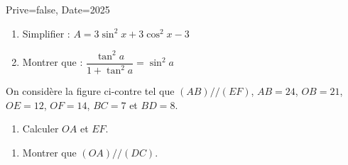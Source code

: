 \documentclass[a4paper,12pt]{article}
\begin{document}
\begin{Maquette}[Exam]{Prive=false, Date=2025}
\begin{exercice}[BaremeDetaille]
\begin{enumerate}
\begin{minipage}{0.48\linewidth}
\anserline[6]
\end{minipage}\hfill\vrule\hfill%
\begin{minipage}{0.48\linewidth}
\anserline[6]
\end{minipage}
\item{} Simplifier  :
$A = 3\sin^{2}x+3\cos^{2}x-3$\newline\anserline[7]
\item{} Montrer que : $ \dfrac{\tan^{2}a}{1+\tan^{2}a}=\sin^{2}a$

\anserline[7]
\end{enumerate}
\end{exercice}

\begin{exercice}[BaremeDetaille]
On considère la figure ci-contre tel que $(AB)//(EF)$, $AB=24$, $OB=21$, $OE=12$, $OF=14$, $BC=7$ et $BD=8$.
\vspace*{2mm}

\begin{minipage}{.7\linewidth}
\begin{enumerate}
\item{} Calculer $OA$ et $EF$.\newline\anserline[6]
\end{enumerate}
\end{minipage}%
\begin{minipage}{.3\linewidth}
\end{minipage}\vspace{5mm}

\begin{adjustbox}{minipage=0.97\linewidth, right}
\anserline[8]
\end{adjustbox}

\begin{enumerate}[start=2]
\item{} Montrer que $(OA)//(DC)$.\newline\anserline[12]
\end{enumerate}
\end{exercice}

\end{Maquette}
\end{document}
